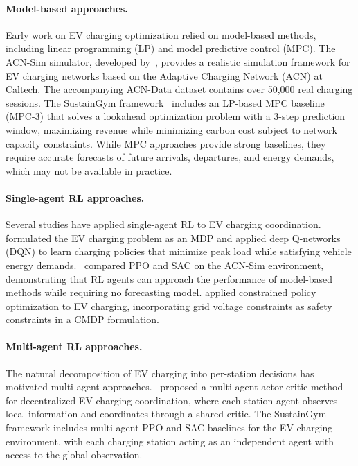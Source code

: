 \paragraph{Model-based approaches.} Early work on EV charging optimization relied on model-based methods, including linear programming (LP) and model predictive control (MPC). The ACN-Sim simulator, developed by~\citet{lee2019acndata}, provides a realistic simulation framework for EV charging networks based on the Adaptive Charging Network (ACN) at Caltech. The accompanying ACN-Data dataset contains over 50,000 real charging sessions. The SustainGym framework~\citep{yeh2023sustaingym} includes an LP-based MPC baseline (MPC-3) that solves a lookahead optimization problem with a 3-step prediction window, maximizing revenue while minimizing carbon cost subject to network capacity constraints. While MPC approaches provide strong baselines, they require accurate forecasts of future arrivals, departures, and energy demands, which may not be available in practice.

\paragraph{Single-agent RL approaches.} Several studies have applied single-agent RL to EV charging coordination.~\citet{wan2019ev_dqn} formulated the EV charging problem as an MDP and applied deep Q-networks (DQN) to learn charging policies that minimize peak load while satisfying vehicle energy demands.~\citet{lee2019acndata} compared PPO and SAC on the ACN-Sim environment, demonstrating that RL agents can approach the performance of model-based methods while requiring no forecasting model. \citet{zhang2020ev_cpo} applied constrained policy optimization to EV charging, incorporating grid voltage constraints as safety constraints in a CMDP formulation.

\paragraph{Multi-agent RL approaches.} The natural decomposition of EV charging into per-station decisions has motivated multi-agent approaches.~\citet{qiu2023marl_ev} proposed a multi-agent actor-critic method for decentralized EV charging coordination, where each station agent observes local information and coordinates through a shared critic. The SustainGym framework includes multi-agent PPO and SAC baselines for the EV charging environment, with each charging station acting as an independent agent with access to the global observation.


